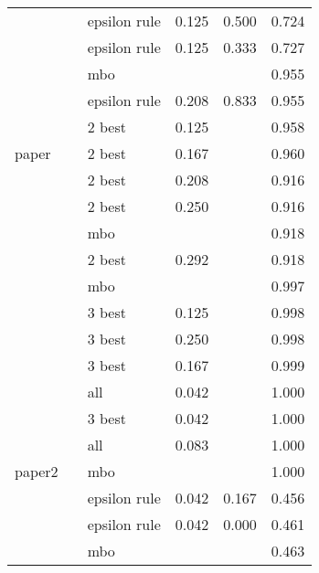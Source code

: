 \begin{table}
\begin{tabular}[t]{lrlrrr}
 &  & epsilon rule & 0.125 & 0.500 & 0.724\\

 & \multirow{-4}{*}{\raggedleft\arraybackslash 1000} & epsilon rule & 0.125 & 0.333 & 0.727\\
\cmidrule{2-6}
 &  & mbo &  &  & 0.955\\

 &  & epsilon rule & 0.208 & 0.833 & 0.955\\

 &  & 2 best & 0.125 &  & 0.958\\

\multirow{-12}{*}{\raggedright\arraybackslash paper} & \multirow{-4}{*}{\raggedleft\arraybackslash 2000} & 2 best & 0.167 &  & 0.960\\
\cmidrule{1-6}
 &  & 2 best & 0.208 &  & 0.916\\

 &  & 2 best & 0.250 &  & 0.916\\

 &  & mbo &  &  & 0.918\\

 & \multirow{-4}{*}{\raggedleft\arraybackslash 500} & 2 best & 0.292 &  & 0.918\\
\cmidrule{2-6}
 &  & mbo &  &  & 0.997\\

 &  & 3 best & 0.125 &  & 0.998\\

 &  & 3 best & 0.250 &  & 0.998\\

 & \multirow{-4}{*}{\raggedleft\arraybackslash 1000} & 3 best & 0.167 &  & 0.999\\
\cmidrule{2-6}
 &  & all & 0.042 &  & 1.000\\

 &  & 3 best & 0.042 &  & 1.000\\

 &  & all & 0.083 &  & 1.000\\

\multirow{-12}{*}{\raggedright\arraybackslash paper2} & \multirow{-4}{*}{\raggedleft\arraybackslash 2000} & mbo &  &  & 1.000\\
\cmidrule{1-6}
 &  & epsilon rule & 0.042 & 0.167 & 0.456\\

 &  & epsilon rule & 0.042 & 0.000 & 0.461\\

 &  & mbo &  &  & 0.463\\


\end{tabular}
\end{table}
